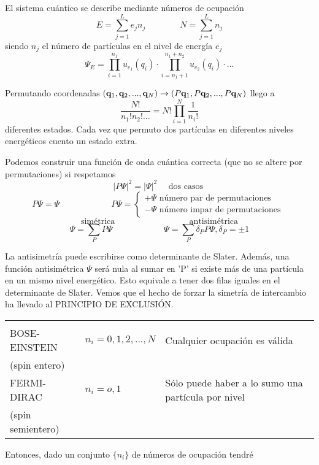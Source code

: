 \documentclass[10pt,oneside]{CBFT_book}
\begin{document}
El sistema cuántico se describe mediante números de ocupación
\[
	E = \sum_{j=1}^L e_j n_j  \qquad \qquad  N = \sum_{j=1}^L  n_j
\]
siendo $n_j$ el número de partículas en el nivel de energía $e_j$ 
\[
	\Psi_E = \prod_{i=1}^{n_1} u_{e_1}(q_i) \cdot \prod_{i = n_1 + 1 }^{ n_1 + n_2 } u_{e_2}(q_i) \cdot ...
\]

Permutando coordenadas $(\vb{q}_1,\vb{q}_2,...,\vb{q}_N ) \to (P\vb{q}_1,P\vb{q}_2,...,P\vb{q}_N)$ llego a
\[
	\frac{N!}{n_1!n_2!...} = N! \prod_{i=1}^N \frac{1}{n_i!}
\]
diferentes estados. Cada vez que permuto dos partículas en diferentes niveles energéticos cuento un estado extra.

Podemos construir una función de onda cuántica correcta (que no se altere por permutaciones) si respetamos
\[
	| P\Psi |^2 = | \Psi |^2 \quad \text{ dos casos }
\]
\[
	P\Psi = \Psi \qquad \qquad \qquad P\Psi = 
	\begin{cases}
	+ \Psi \text{ número par de permutaciones } \\ 
	- \Psi \text{ número impar de permutaciones } 
	\end{cases}
\]
\[
	\text{ simétrica } \qquad \qquad \qquad \qquad \text{ antisimétrica } 
\]
\[
	\Psi = \sum_P P\Psi \qquad \qquad \qquad \Psi = \sum_P \delta_P P\Psi, \delta_P = \pm 1
\]

La antisimetría puede escribirse como determinante de Slater. Además, una función antisimétrica $\Psi$ será nula 
al sumar en 'P' si existe más de una partícula en un mismo nivel energético. Esto equivale a tener dos filas
iguales en el determinante de Slater.
Vemos que el hecho de forzar la simetría de intercambio ha llevado al PRINCIPIO DE EXCLUSIÓN.

\begin{center}
\begin{tabular}{|l|l|l|}
\hline
 & & \\
BOSE-EINSTEIN & $ n_i = 0,1,2, ... , N $ & Cualquier ocupación es válida \\
 (spin entero) & & \\
FERMI-DIRAC  & $ n_i = o, 1 $ & Sólo puede haber a lo sumo una partícula por nivel \\
 (spin semientero) & & \\
\hline
\end{tabular}
\end{center}

Entonces, dado un conjunto $ \{ n_i \} $ de números de ocupación tendré 
\end{document}
